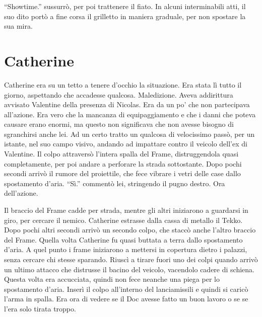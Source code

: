     ``Showtime.'' sussurrò, per poi trattenere il fiato. In alcuni interminabili atti, il suo dito portò a fine corsa il grilletto in
    maniera graduale, per non spostare la sua mira.

  \section*{Catherine}

    Catherine era su un tetto a tenere d'occhio la situazione. Era stata lì tutto il giorno, aspettando che accadesse
    qualcosa. Maledizione. Aveva addirittura avvisato Valentine della presenza di Nicolas. Era da un po' che non
    partecipava all'azione. Era vero che la mancanza di equipaggiamento e che i danni che poteva causare erano enormi, ma
    questo non significava che non avesse bisogno di sgranchirsi anche lei. Ad un certo tratto un qualcosa di
    velocissimo passò, per un istante, nel suo campo visivo, andando ad impattare contro il veicolo dell'ex di
    Valentine. Il colpo attraversò l'intera spalla del Frame, distruggendola quasi completamente, per poi andare a
    perforare la strada sottostante. Dopo pochi secondi arrivò il rumore del proiettile, che fece vibrare i vetri delle
    case dallo spostamento d'aria. ``Sì.'' commentò lei, stringendo il pugno destro. Ora dell'azione.

    Il braccio del Frame cadde per strada, mentre gli altri iniziarono a guardarsi in giro, per cercare il nemico.
    Catherine estrasse dalla cassa di metallo il Tekko. Dopo pochi altri secondi arrivò un secondo colpo, che staccò
    anche l'altro braccio del Frame. Quella volta Catherine fu quasi buttata a terra dallo spostamento d'aria. A quel
    punto i frame iniziarono a mettersi in copertura dietro i palazzi, senza cercare chi stesse sparando. Riuscì a
    tirare fuori uno dei colpi quando arrivò un ultimo attacco che distrusse il bacino del veicolo, vacendolo cadere di
    schiena. Questa volta era
    accucciata, quindi non fece neanche una piega per lo spostamento d'aria. Inserì il colpo all'interno del
    lanciamissili e quindi si caricò l'arma in spalla. Era ora di vedere se il Doc avesse fatto un buon lavoro o se se
    l'era solo tirata troppo.

